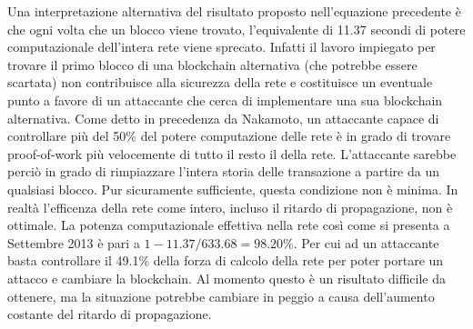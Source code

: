 Una interpretazione alternativa del risultato proposto nell'equazione precedente è che ogni volta che un blocco viene trovato, l'equivalente di 11.37 secondi di potere computazionale dell'intera rete viene sprecato. Infatti il lavoro impiegato per trovare il primo blocco di una blockchain alternativa (che potrebbe essere scartata) non contribuisce alla sicurezza della rete e costituisce un eventuale punto a favore di un attaccante che cerca di implementare una sua blockchain alternativa. Come detto in precedenza da Nakamoto, un attaccante capace di controllare più del 50\% del potere computazione delle rete è in grado di trovare proof-of-work più velocemente di tutto il resto il della rete. L'attaccante sarebbe perciò in grado di rimpiazzare l'intera storia delle transazione a partire da un qualsiasi blocco. Pur sicuramente sufficiente, questa condizione non è minima. In realtà l'efficenza della rete come intero, incluso il ritardo di propagazione, non è ottimale. La potenza computazionale effettiva nella rete così come si presenta a Settembre 2013 è pari a $1 - 11.37 / 633.68 = 98.20\%$. Per cui ad un attaccante basta controllare il 49.1\% della forza di calcolo della rete per poter portare un attacco e cambiare la blockchain. Al momento questo è un risultato difficile da ottenere, ma la situazione potrebbe cambiare in peggio a causa dell'aumento costante del ritardo di propagazione.
